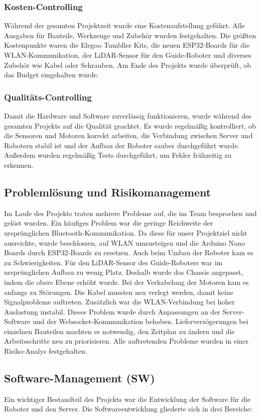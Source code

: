 \subsubsection{Kosten-Controlling}
Während der gesamten Projektzeit wurde eine Kostenaufstellung geführt. Alle Ausgaben für Bauteile, Werkzeuge und Zubehör wurden festgehalten.
Die größten Kostenpunkte waren die Elegoo Tumbller Kits, die neuen ESP32-Boards für die WLAN-Kommunikation, der LiDAR-Sensor für den Guide-Roboter und diverses Zubehör wie Kabel oder Schrauben.
Am Ende des Projekts wurde überprüft, ob das Budget eingehalten wurde.
\subsubsection{Qualitäts-Controlling}
Damit die Hardware und Software zuverlässig funktionieren, wurde während des gesamten Projekts auf die Qualität geachtet.
Es wurde regelmäßig kontrolliert, ob die Sensoren und Motoren korrekt arbeiten, die Verbindung zwischen Server und Robotern stabil ist und der Aufbau der Roboter sauber durchgeführt wurde.
Außerdem wurden regelmäßig Tests durchgeführt, um Fehler frühzeitig zu erkennen.
%
\subsection{Problemlösung und Risikomanagement}
%
Im Laufe des Projekts traten mehrere Probleme auf, die im Team besprochen und gelöst wurden.
Ein häufiges Problem war die geringe Reichweite der ursprünglichen Bluetooth-Kommunikation. Da diese für unser Projektziel nicht ausreichte, wurde beschlossen, auf WLAN umzusteigen und die Arduino Nano Boards durch ESP32-Boards zu ersetzen.
Auch beim Umbau der Roboter kam es zu Schwierigkeiten. Für den LiDAR-Sensor des Guide-Roboters war im ursprünglichen Aufbau zu wenig Platz. Deshalb wurde das Chassis angepasst, indem die obere Ebene erhöht wurde.
Bei der Verkabelung der Motoren kam es anfangs zu Störungen. Die Kabel mussten neu verlegt werden, damit keine Signalprobleme auftreten.
Zusätzlich war die WLAN-Verbindung bei hoher Auslastung instabil. Dieses Problem wurde durch Anpassungen an der Server-Software und der Websocket-Kommunikation behoben.
Lieferverzögerungen bei einzelnen Bauteilen machten es notwendig, den Zeitplan zu ändern und die Arbeitsschritte neu zu priorisieren.
Alle auftretenden Probleme wurden in einer Risiko-Analys festgehalten.
\subsection{Software-Management (SW)}
%
Ein wichtiger Bestandteil des Projekts war die Entwicklung der Software für die Roboter und den Server.
Die Softwareentwicklung gliederte sich in drei Bereiche:
